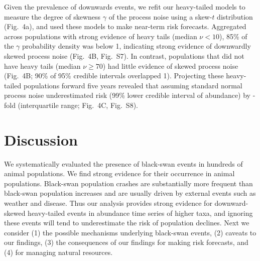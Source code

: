 \documentclass[9pt,twocolumn,twoside]{pnas-new}
\newcommand{\figskewnu}{{7}}
\newcommand{\figskewprojections}{{8}}
\begin{document}
Given the prevalence of downwards events, we refit our heavy-tailed models to
measure the degree of skewness \(\gamma\) of the process noise using a skew-$t$
distribution (Fig.~4a), and used these models to make near-term risk forecasts.
Aggregated across populations with strong evidence of heavy tails (median \(\nu
< 10\)), 85\% of the \(\gamma\) probability density was below 1, indicating
strong evidence of downwardly skewed process noise (Fig.~4B,
Fig.~S\figskewnu). In contrast, populations that did not have heavy
tails (median \(\nu \geq 70\)) had little evidence of skewed process noise
(Fig.~4B; 90\% of 95\% credible intervals overlapped 1). Projecting these
heavy-tailed populations forward five years revealed that assuming standard
normal process noise underestimated risk (99\% lower credible interval of
abundance) by \crashUnderRange-fold (interquartile range; Fig.~4C,
Fig.~S\figskewprojections).

\section*{Discussion}

We systematically evaluated the presence of black-swan events in hundreds of
animal populations.
We find strong evidence for their occurrence in animal populations. Black-swan
population crashes are substantially more frequent
than black-swan population
increases and are usually driven by external events such as weather and
disease.
Thus our analysis provides strong evidence
for downward-skewed heavy-tailed events in abundance time series of higher
taxa, and ignoring these events will tend to underestimate the risk of
population declines.
Next we consider
(1) the possible mechanisms underlying black-swan events,
(2) caveats to our findings,
(3) the consequences of our findings for making risk forecasts, and
(4) for managing natural resources.

\end{document}
